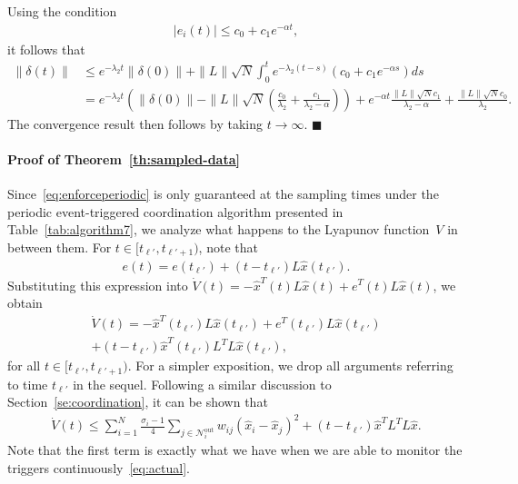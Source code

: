 \documentclass[]{book}
\newcommand{\NN}{{\mathcal{N}}}
\newcommand{\TwoNorm}[1]{\|#1\|_2}
\renewcommand{\TwoNorm}[1]{\|#1\|}
\begin{document}
Using the condition
\begin{align*}
  | e_i(t) | \leq c_0 + c_1 e^{-\alpha t},
\end{align*}
it follows that
\begin{align*}
  \TwoNorm{\delta(t)} &\leq e^{-\lambda_2 t} \TwoNorm{\delta(0)} +
  \TwoNorm{L} \sqrt{N} \int_0^t e^{-\lambda_2(t-s)} (c_0 + c_1
  e^{-\alpha s}) ds
  \\
  &= e^{-\lambda_2 t} \left( \TwoNorm{\delta(0)} - \TwoNorm{L}
    \sqrt{N} \left( \frac{c_0}{\lambda_2} + \frac{c_1}{\lambda_2 -
        \alpha} \right) \right) + e^{-\alpha t} \frac{ \TwoNorm{L}
    \sqrt{N} c_1}{\lambda_2 - \alpha} + \frac{ \TwoNorm{L} \sqrt{N}
    c_0 }{\lambda_2}.
\end{align*}
The convergence result then follows by taking $t \rightarrow \infty$. 
\hfill $\blacksquare$

\paragraph{\textbf{Proof of Theorem~\ref{th:sampled-data}}}
Since~\eqref{eq:enforceperiodic} is only guaranteed at the sampling
times under the periodic event-triggered coordination algorithm presented
in Table~\ref{tab:algorithm7}, we analyze what happens to the Lyapunov
function~$V$ in between them.  For $t \in [t_{\ell'}, t_{\ell'+1})$, note
that
\begin{align*}
  e(t) = e(t_{\ell'}) + (t-t_{\ell'}) L \hat{x}(t_{\ell'}) .
\end{align*}
Substituting this expression into $\dot{V}(t) = -\hat{x}^T(t) L
\hat{x}(t) + e^T(t) L \hat{x}(t)$, we obtain
\begin{multline*}
  \dot{V}(t) = -\hat{x}^T(t_{\ell'}) L \hat{x}(t_{\ell'}) + e^T(t_{\ell'}) L
  \hat{x}(t_{\ell'})
  \\
  + (t - t_{\ell'}) \hat{x}^T(t_{\ell'}) L^T L \hat{x}(t_{\ell'}) ,
\end{multline*}
for all $t \in [t_{\ell'}, t_{\ell'+1})$.  For a simpler exposition,
we drop all arguments referring to time $t_{\ell'}$ in the sequel.
Following a similar discussion to Section~\ref{se:coordination}, it can be
shown that
\begin{align*}
  \dot{V}(t) \leq \sum_{i=1}^N \frac{\sigma_i - 1}{4} \sum_{j \in
    \NN_i^\text{out}} w_{ij} (\hat{x}_i - \hat{x}_j)^2 + (t-t_{\ell'})
  \hat{x}^T L^T L \hat{x} .
\end{align*}
Note that the first term is exactly what we have when we are able to
monitor the triggers continuously~\eqref{eq:actual}.
\end{document}
